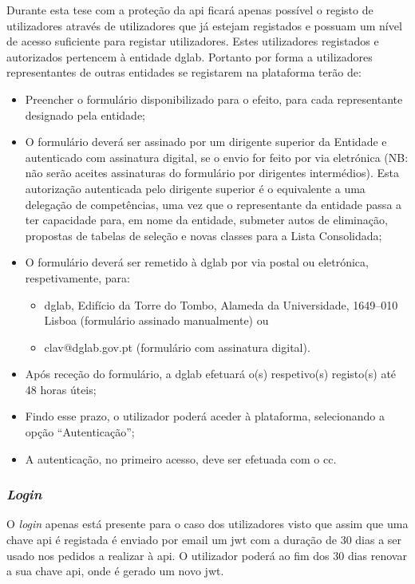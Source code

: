 Durante esta tese com a proteção da \acrshort{api} ficará apenas possível o registo de utilizadores através de utilizadores que já estejam registados e possuam um nível de acesso suficiente para registar utilizadores. Estes utilizadores registados e autorizados pertencem à entidade \acrshort{dglab}. Portanto por forma a utilizadores representantes de outras entidades se registarem na plataforma terão de:~\cite{clavwebpage}
\begin{itemize}
    \item Preencher o formulário disponibilizado para o efeito, para cada representante designado pela entidade;
    \item O formulário deverá ser assinado por um dirigente superior da Entidade e autenticado com assinatura digital, se o envio for feito por via eletrónica (NB\@: não serão aceites assinaturas do formulário por dirigentes intermédios). Esta autorização autenticada pelo dirigente superior é o equivalente a uma delegação de competências, uma vez que o representante da entidade passa a ter capacidade para, em nome da entidade, submeter autos de eliminação, propostas de tabelas de seleção e novas classes para a Lista Consolidada;
    \item O formulário deverá ser remetido à \acrshort{dglab} por via postal ou eletrónica, respetivamente, para:
    \begin{itemize}
        \item \acrshort{dglab}, Edifício da Torre do Tombo, Alameda da Universidade, 1649--010 Lisboa (formulário assinado manualmente) ou
        \item clav@dglab.gov.pt (formulário com assinatura digital).
    \end{itemize}
    \item Após receção do formulário, a \acrshort{dglab} efetuará o(s) respetivo(s) registo(s) até 48 horas úteis;
    \item Findo esse prazo, o utilizador poderá aceder à plataforma, selecionando a opção ``Autenticação'';
    \item A autenticação, no primeiro acesso, deve ser efetuada com o \acrlong{cc}.
\end{itemize}

\subsubsection{\textit{Login}}

O \textit{login} apenas está presente para o caso dos utilizadores visto que assim que uma chave \acrshort{api} é registada é enviado por email um \acrshort{jwt} com a duração de 30 dias a ser usado nos pedidos a realizar à \acrshort{api}. O utilizador poderá ao fim dos 30 dias renovar a sua chave \acrshort{api}, onde é gerado um novo \acrshort{jwt}.

